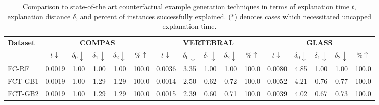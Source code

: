 \begin{table*}[t]
\small
\centering
\begin{tabularx}{0.95\textwidth}{|X|ccccc|ccccc|ccccc|}
\hline\textbf{Dataset} & \multicolumn{5}{c|}{\textbf{COMPAS}} & \multicolumn{5}{c|}{\textbf{VERTEBRAL}} & \multicolumn{5}{c|}{\textbf{GLASS}} \\
& $t\downarrow$ & $\delta_0\downarrow$ & $\delta_1\downarrow$ & $\delta_2\downarrow$ & $\%\uparrow$ & $t\downarrow$ & $\delta_0\downarrow$ & $\delta_1\downarrow$ & $\delta_2\downarrow$ & $\%\uparrow$ & $t\downarrow$ & $\delta_0\downarrow$ & $\delta_1\downarrow$ & $\delta_2\downarrow$ & $\%\uparrow$ \\
\hline
FC-RF   & 0.0019 & 1.00 & 1.00 & 1.00 & 100.0 & 0.0036 & 3.35 & 1.00 & 1.00 & 100.0 & 0.0080 & 4.85 & 1.00 & 1.00 & 100.0 \\
FCT-GB1 & 0.0019 & 1.00 & 1.29 & 1.29 & 100.0 & 0.0014 & 2.50 & 0.62 & 0.72 & 100.0 & 0.0052 & 4.21 & 0.76 & 0.77 & 100.0 \\
FCT-GB2 & 0.0019 & 1.00 & 1.29 & 1.29 & 100.0 & 0.0015 & 2.39 & 0.60 & 0.71 & 100.0 & 0.0039 & 4.02 & 0.67 & 0.73 & 100.0 \\
\hline
\end{tabularx}
\caption{Comparison to state-of-the art counterfactual example generation techniques in terms of explanation time $t$, explanation distance $\delta$, and percent of instances successfully explained. ($\ast$) denotes cases which necessitated uncapped explanation time.}
\label{tab.compare_methods}
\vspace{-7mm}
\end{table*}
